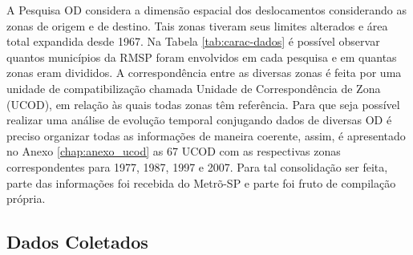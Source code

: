 A Pesquisa OD considera a dimensão espacial dos deslocamentos considerando as zonas de origem e de destino. Tais zonas tiveram seus limites alterados e área total expandida desde 1967. Na Tabela \ref{tab:carac-dados} é possível observar quantos municípios da RMSP foram envolvidos em cada pesquisa e em quantas zonas eram divididos. A correspondência entre as diversas zonas é feita por uma unidade de compatibilização chamada Unidade de Correspondência de Zona (UCOD), em relação às quais todas zonas têm referência. Para que seja possível realizar uma análise de evolução temporal conjugando dados de diversas OD é preciso organizar todas as informações de maneira coerente, assim, é apresentado no Anexo \ref{chap:anexo_ucod} as 67 UCOD  com as respectivas zonas correspondentes para 1977, 1987, 1997 e 2007. Para tal consolidação ser feita, parte das informações foi recebida do Metrõ-SP e parte foi fruto de compilação própria.


\begin{table}[htb]
\end{table}


\subsection{Dados Coletados}\label{subsec:dados-coletados}

